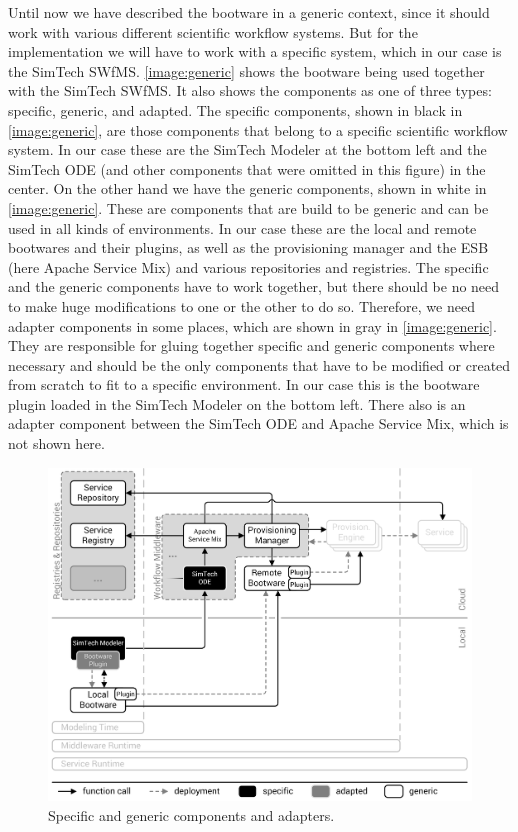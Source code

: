 Until now we have described the bootware in a generic context, since it should work with various different scientific workflow systems.
But for the implementation we will have to work with a specific system, which in our case is the SimTech SWfMS.
\autoref{image:generic} shows the bootware being used together with the SimTech SWfMS.
It also shows the components as one of three types: specific, generic, and adapted.
The specific components, shown in black in \autoref{image:generic}, are those components that belong to a specific scientific workflow system.
In our case these are the SimTech Modeler at the bottom left and the SimTech ODE (and other components that were omitted in this figure) in the center.
On the other hand we have the generic components, shown in white in \autoref{image:generic}.
These are components that are build to be generic and can be used in all kinds of environments.
In our case these are the local and remote bootwares and their plugins, as well as the provisioning manager and the ESB (here Apache Service Mix) and various repositories and registries.
The specific and the generic components have to work together, but there should be no need to make huge modifications to one or the other to do so.
Therefore, we need adapter components in some places, which are shown in gray in \autoref{image:generic}.
They are responsible for gluing together specific and generic components where necessary and should be the only components that have to be modified or created from scratch to fit to a specific environment.
In our case this is the bootware plugin loaded in the SimTech Modeler on the bottom left.
There also is an adapter component between the SimTech ODE and Apache Service Mix, which is not shown here.

\begin{figure}[!htbp]
	\centering
	\includegraphics[resolution=600]{implementation/assets/generic}
	\caption{Specific and generic components and adapters.}
	\label{image:generic}
\end{figure}

